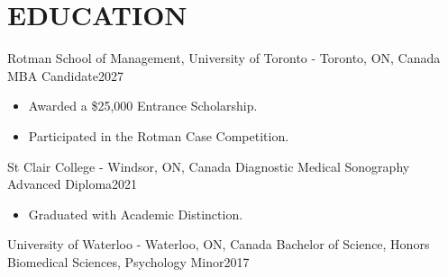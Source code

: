 
\section{\textcolor{airforceblue}{EDUCATION}}
  \employmentSubheadingListStart
    \employmentSubheading
      {Rotman School of Management, University of Toronto - Toronto, ON, Canada}{}
      {MBA Candidate}{2027}
      \begin{itemize}[leftmargin=1.5em]
        \item Awarded a \$25,000 Entrance Scholarship.
        \item Participated in the Rotman Case Competition.
      \end{itemize}
    \employmentSubheading
      {St Clair College - Windsor, ON, Canada}{}
      {Diagnostic Medical Sonography Advanced Diploma}{2021}
      \begin{itemize}[leftmargin=1.5em]
        \item Graduated with Academic Distinction.
      \end{itemize}
    \employmentSubheading
      {University of Waterloo - Waterloo, ON, Canada}{}
      {Bachelor of Science, Honors Biomedical Sciences, Psychology Minor}{2017}
  \employmentSubheadingListEnd
  \vspace{-16pt}

